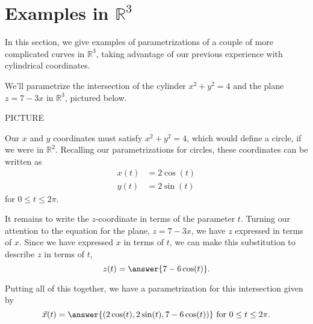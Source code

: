 \documentclass{ximera}
\begin{document}
\section{Examples in $\mathbb{R}^3$}

In this section, we give examples of parametrizations of a couple of more complicated curves in $\mathbb{R}^3$, taking advantage of our previous experience with cylindrical coordinates.

\begin{example}
We'll parametrize the intersection of the cylinder $x^2 + y^2 = 4$ and the plane $z = 7-3x$ in $\mathbb{R}^3$, pictured below.

PICTURE

Our $x$ and $y$ coordinates must satisfy $x^2 + y^2 = 4$, which would define a circle, if we were in $\mathbb{R}^2$. Recalling our parametrizations for circles, these coordinates can be written as
\begin{align*}
x(t) &= 2\cos(t)\\
y(t) &= 2\sin(t)
\end{align*}
for $0\leq t\leq 2\pi$.

It remains to write the $z$-coordinate in terms of the parameter $t$. Turning our attention to the equation for the plane, $z = 7-3x$, we have $z$ expressed in terms of $x$. Since we have expressed $x$ in terms of $t$, we can make this substitution to describe $z$ in terms of $t$,
\[
z(t) = \answer{7-6\cos(t)}.
\]

Putting all of this together, we have a parametrization for this intersection given by
\[
\vec{x}(t) = \answer{(2\cos(t),2\sin(t),7-6\cos(t))} \textrm{ for } 0\leq t\leq 2\pi.
\]
\end{example}
\end{document}

